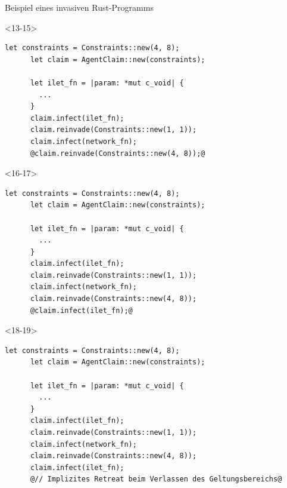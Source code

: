 \begin{frame}[fragile]{Beispiel eines invasiven Rust-Programms}
  \begin{onlyenv}<13-15>
    \begin{lstlisting}[frame=single,style=base]
      let constraints = Constraints::new(4, 8);
      let claim = AgentClaim::new(constraints);

      let ilet_fn = |param: *mut c_void| {
        ...
      }
      claim.infect(ilet_fn);
      claim.reinvade(Constraints::new(1, 1));
      claim.infect(network_fn);
      @claim.reinvade(Constraints::new(4, 8));@

      \end{lstlisting}
  \end{onlyenv}

  \begin{onlyenv}<16-17>
    \begin{lstlisting}[frame=single,style=base]
      let constraints = Constraints::new(4, 8);
      let claim = AgentClaim::new(constraints);

      let ilet_fn = |param: *mut c_void| {
        ...
      }
      claim.infect(ilet_fn);
      claim.reinvade(Constraints::new(1, 1));
      claim.infect(network_fn);
      claim.reinvade(Constraints::new(4, 8));
      @claim.infect(ilet_fn);@
      \end{lstlisting}
  \end{onlyenv}

  \begin{onlyenv}<18-19>
    \begin{lstlisting}[frame=single,style=base]
      let constraints = Constraints::new(4, 8);
      let claim = AgentClaim::new(constraints);

      let ilet_fn = |param: *mut c_void| {
        ...
      }
      claim.infect(ilet_fn);
      claim.reinvade(Constraints::new(1, 1));
      claim.infect(network_fn);
      claim.reinvade(Constraints::new(4, 8));
      claim.infect(ilet_fn);
      @// Implizites Retreat beim Verlassen des Geltungsbereichs@\end{lstlisting}
  \end{onlyenv}




  

\end{frame}